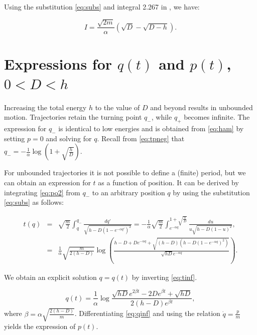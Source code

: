 \documentclass{ws-ijbc}
\begin{document}
Using the substitution \eqref{eq:subs} and integral 2.267 in \cite{gradshteyn1980table}, we have:

\begin{equation}
I = \frac{\sqrt{2m}}{\alpha} \left(\sqrt{D}-\sqrt{D-h}\right).
\label{eq:action5}
\end{equation}

\section{Expressions for $q(t)$ and $p(t)$, $0 < D < h$}
\label{sec:Dleqh}

Increasing the total energy $h$ to the value of $D$ and beyond results in unbounded motion. Trajectories retain the turning point $q_-$, while $q_+$ becomes infinite. The expression for $q_-$ is identical to low energies and is obtained from \eqref{eq:ham} by setting $p=0$ and solving for $q$. Recall from \eqref{eq:tpneg} that $q_- = - \frac{1}{\alpha} \log \left(1 + \sqrt{\frac{h}{D}}  \right)$.

For unbounded trajectories it is not possible to define a (finite) period, but we can obtain an expression for $t$ as a function of position. It can be derived by integrating \eqref{eq:po2} from $q_-$ to an arbitrary position $q$ by using the substitution \eqref{eq:subs} as follows:

\begin{eqnarray}
t(q) & = & \sqrt{\frac{m}{2}} \int_{q}^{q_-} \frac{dq'}{ \sqrt{h-D \left( 1-e^{-\alpha q'} \right)^2}}=
       -\frac{1}{\alpha}\sqrt{\frac{m}{2}} \int_{e^{-\alpha q}}^{1+\sqrt{\frac{h}{D}}} \frac{du}{u \sqrt{h-D \left( 1-u \right)^2}},\nonumber \\
       & = & \frac{1}{\alpha}\sqrt{\frac{m}{2(h-D)}} \log{\left(\frac{h-D+De^{-\alpha q}+\sqrt{(h-D)(h-D(1-e^{-\alpha q})^2)}}{\sqrt{hD}e^{-\alpha q}}\right)}.
\label{eq:tinf}
\end{eqnarray}

We obtain an explicit solution $q=q(t)$ by inverting \eqref{eq:tinf}.

\begin{equation}
q(t) = \frac{1}{\alpha} \log{ \frac{\sqrt{hD}e^{2\beta t} -2De^{\beta t} + \sqrt{hD}}{2(h-D)e^{\beta t}} },
\label{eq:qinf}
\end{equation}
where $\beta=\alpha\sqrt{\frac{2(h-D)}{m}}$. Differentiating \eqref{eq:qinf} and using the relation $\dot{q} = \frac{p}{m}$ yields the expression of $p(t)$.
\end{document}
